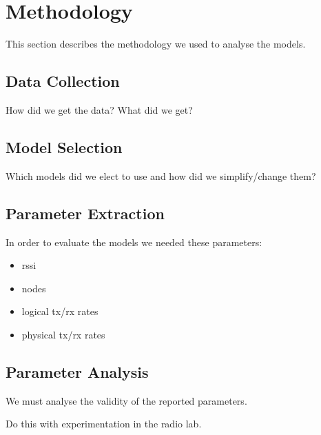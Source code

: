 \chapter{Methodology}

This section describes the methodology we used to analyse the models.

\section{Data Collection}

How did we get the data? What did we get?

\section{Model Selection}

Which models did we elect to use and how did we simplify/change them?

\section{Parameter Extraction}

In order to evaluate the models we needed these parameters:

\begin{itemize}
\item rssi
\item nodes
\item logical tx/rx rates
\item physical tx/rx rates
\end{itemize}

\section{Parameter Analysis}

We must analyse the validity of the reported parameters.

Do this with experimentation in the radio lab.

